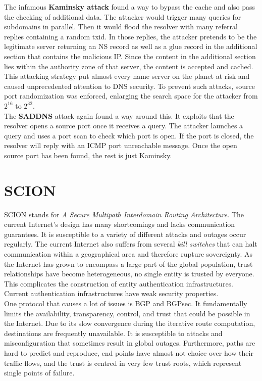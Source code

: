 The infamous \textbf{Kaminsky attack} found a way to bypass the cache and also pass the checking of additional data. The attacker would trigger many queries for subdomains in parallel. Then it would flood the resolver with many referral replies containing a random txid. In those replies, the attacker pretends to be the legitimate server returning an NS record as well as a glue record in the additional section that contains the malicious IP. Since the content in the additional section lies within the authority zone of that server, the content is accepted and cached. This attacking strategy put almost every name server on the planet at risk and caused unprecedented attention to DNS security. To prevent such attacks, source port randomization was enforced, enlarging the search space for the attacker from $2^{16}$ to $2^{32}$.\vspace{.3cm}\\

The \textbf{SADDNS} attack again found a way around this. It exploits that the resolver opens a source port once it receives a query. The attacker launches a query and uses a port scan to check which port is open. If the port is closed, the resolver will reply with an ICMP port unreachable message. Once the open source port has been found, the rest is just Kaminsky.


\section{SCION}
SCION stands for \textit{A Secure Multipath Interdomain Routing Architecture}. The current Internet's design has many shortcomings and lacks communication guarantees. It is susceptible to a variety of different attacks and outages occur regularly. The current Internet also suffers from several \textit{kill switches} that can halt communication within a geographical area and therefore rupture sovereignty. As the Internet has grown to encompass a large part of the global population, trust relationships have become heterogeneous, no single entity is trusted by everyone. This complicates the construction of entity authentication infrastructures. Current authentication infrastructures have weak security properties. \vspace{.3cm}\\

One protocol that causes a lot of issues is BGP and BGPsec. It fundamentally limits the availability, transparency, control, and trust that could be possible in the Internet. Due to its slow convergence during the iterative route computation, destinations are frequently unavailable. It is susceptible to attacks and misconfiguration that sometimes result in global outages. Furthermore, paths are hard to predict and reproduce, end points have almost not choice over how their traffic flows, and the trust is centred in very few trust roots, which represent single points of failure.

